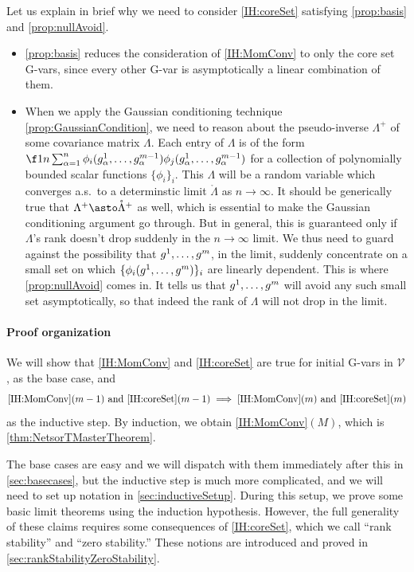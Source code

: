 \documentclass[main.tex]{subfiles}
\begin{document}
Let us explain in brief why we need to consider \ref{IH:coreSet} satisfying \ref{prop:basis} and \ref{prop:nullAvoid}.
\begin{itemize}
\item
    \ref{prop:basis} reduces the consideration of \ref{IH:MomConv} to only the core set G-vars, since every other G-var is asymptotically a linear combination of them.
\item
    When we apply the Gaussian conditioning technique \cref{prop:GaussianCondition}, we need to reason about the pseudo-inverse $\Lambda^+$ of some covariance matrix $\Lambda$.
    Each entry of $\Lambda$ is of the form $\f 1 n \sum_{\alpha=1}^n \phi_i(g^1_\alpha, \ldots, g^{\MM-1}_\alpha) \phi_j(g^1_\alpha, \ldots, g^{\MM-1}_\alpha)$ for a collection of polynomially bounded scalar functions $\{\phi_i\}_i$.
    This $\Lambda$ will be a random variable which converges a.s.\ to a determinstic limit $\mathring \Lambda$  as $n \to \infty$.
    It should be generically true that $\Lambda^+ \asto \mathring \Lambda^+$ as well, which is essential to make the Gaussian conditioning argument go through.
    But in general, this is guaranteed only if $\Lambda$'s rank doesn't drop suddenly in the $n \to \infty$ limit.
    We thus need to guard against the possibility that $g^1, \ldots, g^m$, in the limit, suddenly concentrate on a small set on which $\{\phi_i(g^1, \ldots, g^m)\}_i$ are linearly dependent.
    This is where \ref{prop:nullAvoid} comes in.
    It tells us that $g^1, \ldots, g^m$ will avoid any such small set asymptotically, so that indeed the rank of $\Lambda$ will not drop in the limit.
\end{itemize}

\paragraph{Proof organization}

We will show that \ref{IH:MomConv} and \ref{IH:coreSet} are true for initial G-vars in $\mathcal V$, as the base case, and
\begin{equation*}
\text{\ref{IH:MomConv}}(m-1) \text{ and } \text{\ref{IH:coreSet}}(m-1) \implies \text{\ref{IH:MomConv}}(m) \text{ and } \text{\ref{IH:coreSet}}(m)
\end{equation*}
as the inductive step.
By induction, we obtain \ref{IH:MomConv}$(M)$, which is \cref{thm:NetsorTMasterTheorem}.

The base cases are easy and we will dispatch with them immediately after this in \cref{sec:basecases}, but the inductive step is much more complicated, and we will need to set up notation in \cref{sec:inductiveSetup}.
During this setup, we prove some basic limit theorems using the induction hypothesis.
However, the full generality of these claims requires some consequences of \ref{IH:coreSet}, which we call ``rank stability'' and ``zero stability.''
These notions are introduced and proved in \cref{sec:rankStabilityZeroStability}.
\end{document}
